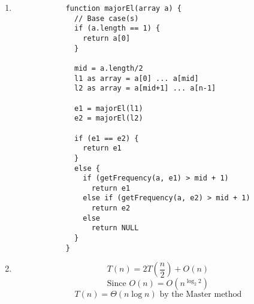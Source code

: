 \documentclass[11pt, letterpaper]{article}
\begin{document}
\begin{enumerate}
\begin{enumerate}
        \item
          \begin{lstlisting}
            function majorEl(array a) {
              // Base case(s)
              if (a.length == 1) {
                return a[0]
              }

              mid = a.length/2
              l1 as array = a[0] ... a[mid]
              l2 as array = a[mid+1] ... a[n-1]

              e1 = majorEl(l1)
              e2 = majorEl(l2)

              if (e1 == e2) {
                return e1
              }
              else {
                if (getFrequency(a, e1) > mid + 1)
                  return e1
                else if (getFrequency(a, e2) > mid + 1)
                  return e2
                else
                  return NULL
              }
            }
          \end{lstlisting}

          \item
            \[ T(n) = 2T(\frac{n}{2}) + O(n) \]
            \[ \text{Since  } O(n) = O(n^{\log _2 2})\]
            \[ T(n) = \boxed{\Theta (n\log n)} \text{ by the Master method} \]
      \end{enumerate}
  \end{enumerate}
\end{document}
